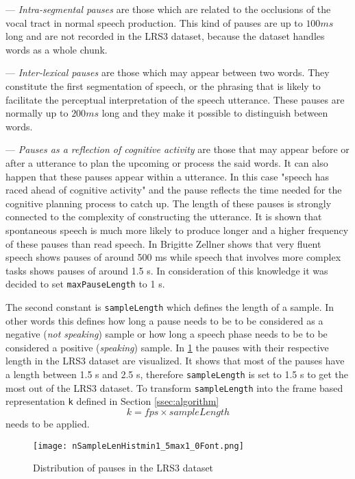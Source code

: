 — \emph{Intra-segmental pauses} are those which are related to the occlusions
of the vocal tract in normal speech production.
This kind of pauses are up to $100ms$ long and are not recorded in the LRS3 dataset, because the dataset handles words as a whole chunk.\cite{BrigPaus1994}

— \emph{Inter-lexical pauses} are those which may appear between two
words. They constitute the first segmentation of speech, or the phrasing
that is likely to facilitate the perceptual interpretation of the speech
utterance.
These pauses are normally up to $200ms$ long and they make it possible to distinguish between words.\cite{BrigPaus1994}

— \emph{Pauses as a reflection of cognitive activity} are those that may appear before or after a utterance to plan the upcoming or process the said words.
It can also happen that these pauses appear within a utterance.
In this case
"speech has raced ahead of cognitive activity" and the
pause reflects the time needed for the cognitive planning process to catch up.
The length of these pauses is strongly connected to the complexity of constructing the utterance.
It is shown that spontaneous speech is much more likely to produce longer and a higher frequency of these pauses than read speech.
In \cite{BrigPaus1994} Brigitte Zellner shows that very fluent speech shows pauses of around 500 ms while speech that involves more complex tasks shows pauses of around 1.5 s. 
In consideration of this knowledge it was decided to set \texttt{maxPauseLength} to 1 s.

 

The second constant is \texttt{sampleLength} which defines the length of a sample.
In other words this defines how long a pause needs to be to be considered as a negative (\emph{not speaking}) sample or how long a speech phase needs to be to be considered a positive (\emph{speaking}) sample.
In \ref{fig:negHist} the pauses with their respective length in the LRS3 dataset are visualized. 
It shows that most of the pauses have a length between 1.5 s and 2.5 s, therefore \texttt{sampleLength} is set to 1.5 s to get the most out of the LRS3 dataset. 
To transform \texttt{sampleLength} into the frame based representation \texttt{k} defined in Section \ref{ssec:algorithm} 
\begin{equation}
k = fps \times sampleLength
\end{equation}
needs to be applied.

\begin{figure}
  \centering
  \texttt{[image: nSampleLenHistmin1\_5max1\_0Font.png]}
  \caption{Distribution of pauses in the LRS3 dataset}
  \label{fig:negHist}
\end{figure}


